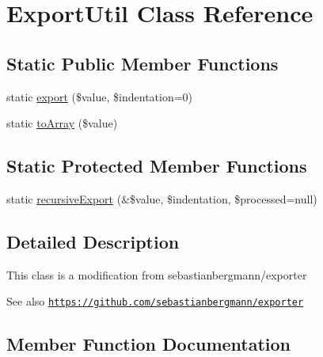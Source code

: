 \hypertarget{class_prophecy_1_1_util_1_1_export_util}{}\section{Export\+Util Class Reference}
\label{class_prophecy_1_1_util_1_1_export_util}
\subsection*{Static Public Member Functions}
\begin{DoxyCompactItemize}
\item 
static \mbox{\hyperlink{class_prophecy_1_1_util_1_1_export_util_a2db3e18d6a675951f7b0c18b0545f4a9}{export}} (\$value, \$indentation=0)
\item 
static \mbox{\hyperlink{class_prophecy_1_1_util_1_1_export_util_ae000b7c960de913865bc706fa5484d3b}{to\+Array}} (\$value)
\end{DoxyCompactItemize}
\subsection*{Static Protected Member Functions}
\begin{DoxyCompactItemize}
\item 
static \mbox{\hyperlink{class_prophecy_1_1_util_1_1_export_util_a9d3acbca8b00e35e7a505f3c82ec805c}{recursive\+Export}} (\&\$value, \$indentation, \$processed=null)
\end{DoxyCompactItemize}


\subsection{Detailed Description}
This class is a modification from sebastianbergmann/exporter \begin{DoxySeeAlso}{See also}
\href{https://github.com/sebastianbergmann/exporter}{\tt https\+://github.\+com/sebastianbergmann/exporter} 
\end{DoxySeeAlso}


\subsection{Member Function Documentation}
\mbox{\label{class_prophecy_1_1_util_1_1_export_util_a2db3e18d6a675951f7b0c18b0545f4a9}} 
